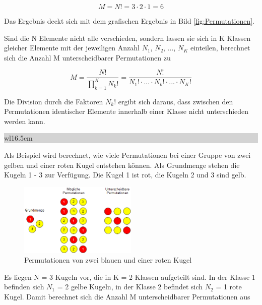 \begin{equation}\label{eq:twotwentyfour}
M=N!=3\cdot 2\cdot 1=6
\end{equation}

\noindent Das Ergebnis deckt sich mit dem grafischen Ergebnis in Bild \ref{fig:Permutationen}.

\noindent Sind die N Elemente nicht alle verschieden, sondern lassen sie sich in K Klassen gleicher Elemente mit der jeweiligen Anzahl $N_{1}$, $N_{2}$, ..., $N_{K}$ einteilen, berechnet sich die Anzahl M unterscheidbarer Permutationen zu

\begin{equation}\label{eq:twotwentyfive}
M=\dfrac{N!}{\prod _{k=1}^{K}N_{\displaystyle k} ! } =\dfrac{N!}{N_{\displaystyle 1} !\cdot ...\cdot N_{k} !\cdot ...\cdot N_{K} !} 
\end{equation}

\noindent Die Division durch die Faktoren $N_{k}$! ergibt sich daraus, dass zwischen den Permutationen identischer Elemente innerhalb einer Klasse nicht unterschieden werden kann.\bigskip

\noindent
\colorbox{lightgray}{%
%
\renewcommand\arraystretch{0.6}%
\begin{tabular}{ wl{16.5cm} }
{\selectfont
{}}
\end{tabular}%
}\bigskip

\noindent Als Beispiel wird berechnet, wie viele Permutationen bei einer Gruppe von zwei gelben und einer roten Kugel entstehen k\"{o}nnen. Als Grundmenge stehen die Kugeln 1 - 3 zur Verf\"{u}gung. Die Kugel 1 ist rot, die Kugeln 2 und 3 sind gelb.

\noindent 
\begin{figure}[H]
  \centerline{\includegraphics[width=0.5\textwidth]{Kapitel2/Bilder/image3}}
  \caption{Permutationen von zwei blauen und einer roten Kugel}
  \label{fig:Permutationen2}
\end{figure}

\noindent Es liegen N = 3 Kugeln vor, die in K = 2 Klassen aufgeteilt sind. In der Klasse 1 befinden sich $N_{1}$ = 2 gelbe Kugeln, in der Klasse 2 befindet sich $N_{2}$ = 1 rote Kugel. Damit berechnet sich die Anzahl M unterscheidbarer Permutationen aus 

